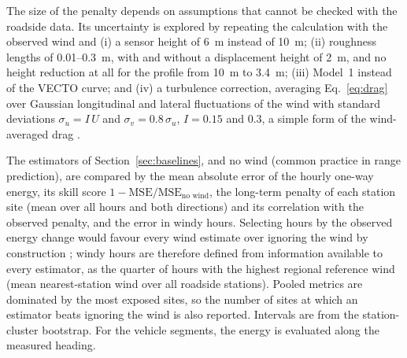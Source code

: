 The size of the penalty depends on assumptions that cannot be checked with the roadside data. Its uncertainty is explored by repeating the calculation with the observed wind and (i) a sensor height of \SI{6}{m} instead of \SI{10}{m}; (ii) roughness lengths of 0.01--\SI{0.3}{m}, with and without a displacement height of \SI{2}{m}, and no height reduction at all for the profile from \SI{10}{m} to \SI{3.4}{m}; (iii) Model~1 instead of the VECTO curve; and (iv) a turbulence correction, averaging Eq.~\eqref{eq:drag} over Gaussian longitudinal and lateral fluctuations of the wind with standard deviations $\sigma_u=I\,U$ and $\sigma_v=0.8\,\sigma_u$, $I=0.15$ and $0.3$, a simple form of the wind-averaged drag \citep{Ingram1978,Windsor2014,WordleySaunders2008}.

The estimators of Section~\ref{sec:baselines}, and no wind (common practice in range prediction), are compared by the mean absolute error of the hourly one-way energy, its skill score $1-\mathrm{MSE}/\mathrm{MSE}_\text{no wind}$, the long-term penalty of each station site (mean over all hours and both directions) and its correlation with the observed penalty, and the error in windy hours. Selecting hours by the observed energy change would favour every wind estimate over ignoring the wind by construction \citep{Lerch2017}; windy hours are therefore defined from information available to every estimator, as the quarter of hours with the highest regional reference wind (mean nearest-station wind over all roadside stations). Pooled metrics are dominated by the most exposed sites, so the number of sites at which an estimator beats ignoring the wind is also reported. Intervals are from the station-cluster bootstrap. For the vehicle segments, the energy is evaluated along the measured heading.

